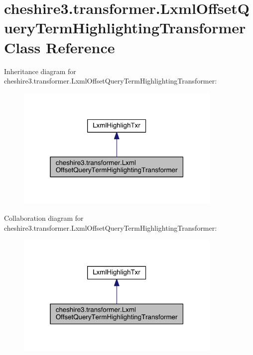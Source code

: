 \hypertarget{classcheshire3_1_1transformer_1_1_lxml_offset_query_term_highlighting_transformer}{\section{cheshire3.\-transformer.\-Lxml\-Offset\-Query\-Term\-Highlighting\-Transformer Class Reference}
\label{classcheshire3_1_1transformer_1_1_lxml_offset_query_term_highlighting_transformer}
}


Inheritance diagram for cheshire3.\-transformer.\-Lxml\-Offset\-Query\-Term\-Highlighting\-Transformer\-:
\nopagebreak
\begin{figure}[H]
\begin{center}
\leavevmode
\includegraphics[width=280pt]{classcheshire3_1_1transformer_1_1_lxml_offset_query_term_highlighting_transformer__inherit__graph}
\end{center}
\end{figure}


Collaboration diagram for cheshire3.\-transformer.\-Lxml\-Offset\-Query\-Term\-Highlighting\-Transformer\-:
\nopagebreak
\begin{figure}[H]
\begin{center}
\leavevmode
\includegraphics[width=280pt]{classcheshire3_1_1transformer_1_1_lxml_offset_query_term_highlighting_transformer__coll__graph}
\end{center}
\end{figure}
